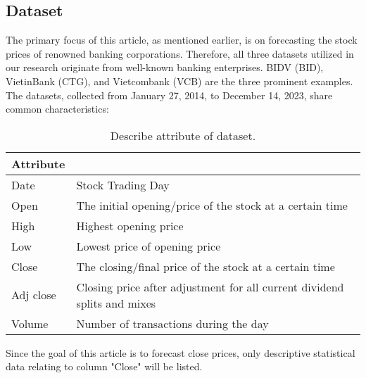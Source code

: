 \documentclass{ieeeojies}
\begin{document}
\subsection{Dataset}

The primary focus of this article, as mentioned earlier, is on forecasting the stock prices of renowned banking corporations. Therefore, all three datasets utilized in our research originate from well-known banking enterprises. BIDV (BID), VietinBank (CTG), and Vietcombank (VCB) are the three prominent examples. The datasets, collected from January 27, 2014, to December 14, 2023, share common characteristics:



\begin{table}[!ht]
    \centering
    \renewcommand{\arraystretch}{2}
    \begin{tabularx}{\columnwidth}{|>{\centering\arraybackslash}l|>{\arraybackslash}X|}
        \hline
        \textbf{Attribute} & \multicolumn{1}{c|}{\textbf{Describe}} \\
        \hline
        Date & Stock Trading Day \\
        \midrule
        Open & The initial opening/price of the stock at a certain time \\
        High & Highest opening price \\
        Low & Lowest price of opening price \\
        Close & The closing/final price of the stock at a certain time \\
        Adj close & Closing price after adjustment for all current dividend splits and mixes \\
        Volume & Number of transactions during the day \\
        \hline
    \end{tabularx}
    \renewcommand{\arraystretch}{1}
    \captionsetup{justification=centering}
    \caption{Describe attribute of dataset.}
    \label{table:dataset_description}
\end{table}

Since the goal of this article is to forecast close prices, only descriptive statistical data relating to column "Close" will be listed.
\end{document}
